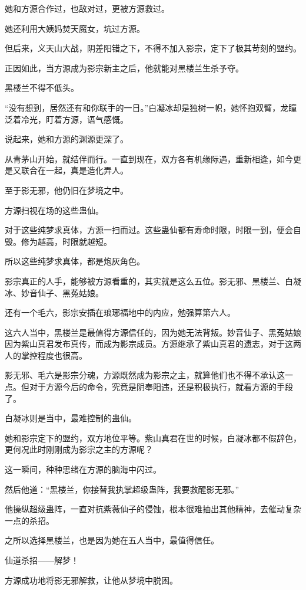 \begin{this_body}
她和方源合作过，也敌对过，更被方源救过。

她还利用大姨妈焚天魔女，坑过方源。

但后来，义天山大战，阴差阳错之下，不得不加入影宗，定下了极其苛刻的盟约。

正因如此，当方源成为影宗新主之后，他就能对黑楼兰生杀予夺。

黑楼兰不得不低头。

“没有想到，居然还有和你联手的一日。”白凝冰却是独树一帜，她怀抱双臂，龙瞳泛着冷光，盯着方源，语气感慨。

说起来，她和方源的渊源更深了。

从青茅山开始，就结伴而行。一直到现在，双方各有机缘际遇，重新相逢，如今更是又联合在一起，真是造化弄人。

至于影无邪，他仍旧在梦境之中。

方源扫视在场的这些蛊仙。

对于这些纯梦求真体，方源一扫而过。这些蛊仙都有寿命时限，时限一到，便会自毁。修为越高，时限就越短。

所以这些纯梦求真体，都是炮灰角色。

影宗真正的人手，能够被方源看重的，其实就是这么五位。影无邪、黑楼兰、白凝冰、妙音仙子、黑菟姑娘。

还有一个毛六，影宗安插在琅琊福地中的内应，勉强算第六人。

这六人当中，黑楼兰是最值得方源信任的，因为她无法背叛。妙音仙子、黑菟姑娘因为紫山真君发布真传，而成为影宗成员。方源继承了紫山真君的遗志，对于这两人的掌控程度也很高。

影无邪、毛六是影宗分魂，方源既然成为影宗之主，就算他们也不得不承认这一点。但对于方源今后的命令，究竟是阴奉阳违，还是积极执行，就看方源的手段了。

白凝冰则是当中，最难控制的蛊仙。

她和影宗定下的盟约，双方地位平等。紫山真君在世的时候，白凝冰都不假辞色，更何况此时刚刚成为影宗之主的方源呢？

这一瞬间，种种思绪在方源的脑海中闪过。

然后他道：“黑楼兰，你接替我执掌超级蛊阵，我要救醒影无邪。”

他操纵超级蛊阵，一直对抗紫薇仙子的侵蚀，根本很难抽出其他精神，去催动复杂一点的杀招。

之所以选择黑楼兰，也是因为她在五人当中，最值得信任。

仙道杀招——解梦！

方源成功地将影无邪解救，让他从梦境中脱困。


\end{this_body}
